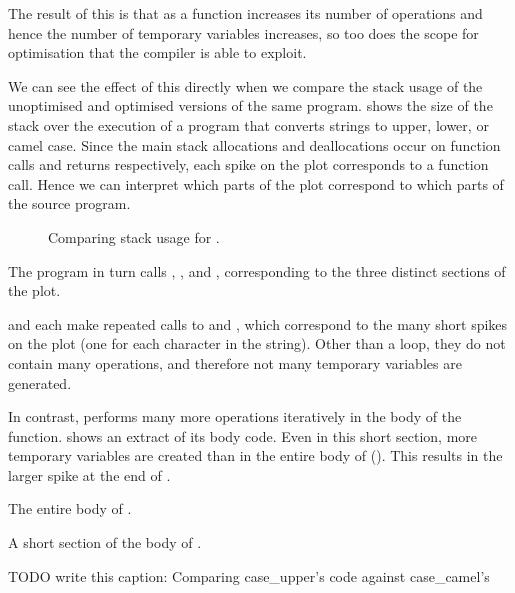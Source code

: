 \documentclass[00-main.tex]{subfiles}
\begin{document}
The result of this is that as a function increases its number of operations and hence the number of temporary variables increases, so too does the scope for optimisation that the compiler is able to exploit.

We can see the effect of this directly when we compare the stack usage of the unoptimised and optimised versions of the same program.
 shows the size of the stack over the execution of a program that converts strings to upper, lower, or camel case.
Since the main stack allocations and deallocations occur on function calls and returns respectively, each spike on the plot corresponds to a function call.
Hence we can interpret which parts of the plot correspond to which parts of the source program.

\begin{figure}[t]
  \centering
  \caption{Comparing stack usage for .}
  \label{fig:comparing stack usage for case.c} %
\end{figure}

The program in turn calls , , and , corresponding to the three distinct sections of the plot.

 and  each make repeated calls to  and , which correspond to the many short spikes on the plot (one for each character in the string).
Other than a  loop, they do not contain many operations, and therefore not many temporary variables are generated.

In contrast,  performs many more operations iteratively in the body of the function.
 shows an extract of its body code.
Even in this short section, more temporary variables are created than in the entire body of  ().
This results in the larger spike at the end of .

\begin{listing}[t]
  \begin{sublisting}[b]{0.49\textwidth}
    \caption{The entire body of .}
    \label{lst:caseupper body code}
  \end{sublisting}
  \hfill
  \begin{sublisting}[b]{0.49\textwidth}
    \caption{A short section of the body of .}
    \label{lst:section of casecamel body code}
  \end{sublisting}
  \caption{TODO write this caption: Comparing case_upper's code against case_camel's}
  \label{lst:caseupper and casecamel body code}
\end{listing}
\end{document}
